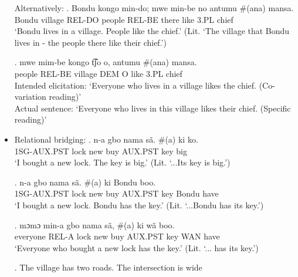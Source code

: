 \documentclass{assets/fieldnotes}
\begin{document}
\begin{itemize}
Alternatively:
\exg. Bondu kongo min-do; mwe min-be no antumu \#(ana) mansa.\\
    Bondu village REL-DO people REL-BE there like 3.PL chief\\
    `Bondu lives in a village. People like the chief.' (Lit. `The village that Bondu lives in - the people there like their chief.')

    
    \exg. mwe mim-be kongo t͡ʃo o, antumu \#(ana) mansa.\\
        people REL-BE village DEM O like 3.PL chief\\
    Intended elicitation: `Everyone who lives in a village likes the chief. (Co-variation reading)'\\
    Actual sentence: `Everyone who lives in this village likes their chief. (Specific reading)'

    \item Relational bridging:
    \exg. n-a gbo nama sã. \#(a) ki ko.\\
        1SG-AUX.PST lock new buy AUX.PST key big\\
        `I bought a new lock. The key is big.' (Lit. `...Its key is big.')

    \exg. n-a gbo nama sã. \#(a) ki Bondu boo.\\
        1SG-AUX.PST lock new buy AUX.PST key Bondu have\\
        `I bought a new lock. Bondu has the key.' (Lit. `...Bondu has its key.')

    \exg. mɔmɔ min-a gbo nama sã, \#(a) ki wã boo.\\
        everyone REL-A lock new buy AUX.PST key WAN have\\
        `Everyone who bought a new lock has the key.' (Lit. `... has its key.')

\ex. The village has two roads. The intersection is wide

 
\end{itemize}
\end{document}
